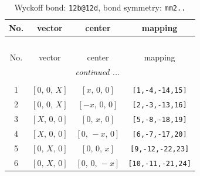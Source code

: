 \documentclass[fleqn,8pt]{jsarticle}
\begin{document}
\begin{longtable}{cccc}
\caption{Wyckoff bond: {\tt 12b@12d}, bond symmetry: {\tt mm2..}}
 \\
 \hline \hline
No. & vector & center & mapping \\ \hline \endfirsthead

\multicolumn{3}{l}{\tablename\ \thetable{}} \\
 \hline \hline
No. & vector & center & mapping \\ \hline \endhead

 \hline \hline
\multicolumn{3}{r}{\footnotesize\it continued ...} \\ \endfoot

 \hline \hline
\multicolumn{3}{r}{} \\ \endlastfoot

1 & $\left[ 0,\, 0,\, X \right]$ & $\left[ x,\, 0,\, 0 \right]$ & {\tt [1,-4,-14,15]} \\ \hline
2 & $\left[ 0,\, 0,\, X \right]$ & $\left[ - x,\, 0,\, 0 \right]$ & {\tt [2,-3,-13,16]} \\ \hline
3 & $\left[ X,\, 0,\, 0 \right]$ & $\left[ 0,\, x,\, 0 \right]$ & {\tt [5,-8,-18,19]} \\ \hline
4 & $\left[ X,\, 0,\, 0 \right]$ & $\left[ 0,\, - x,\, 0 \right]$ & {\tt [6,-7,-17,20]} \\ \hline
5 & $\left[ 0,\, X,\, 0 \right]$ & $\left[ 0,\, 0,\, x \right]$ & {\tt [9,-12,-22,23]} \\ \hline
6 & $\left[ 0,\, X,\, 0 \right]$ & $\left[ 0,\, 0,\, - x \right]$ & {\tt [10,-11,-21,24]} \\
\end{longtable}
\renewcommand{\arraystretch}{1.2}
\end{document}

